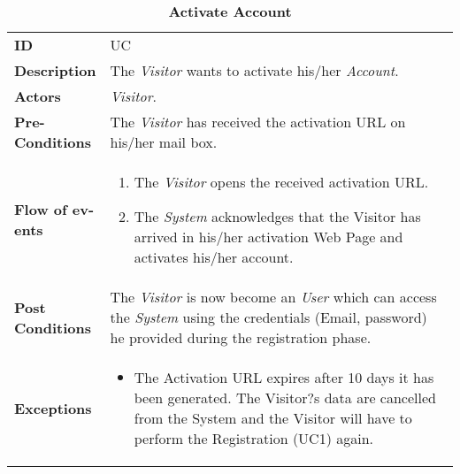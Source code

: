 \begin{longtable}{|p{0.2\linewidth} p{0.8\linewidth}|}
	\captionsetup{labelformat=empty} %
	\caption{\textbf{Activate Account}} %
	\label{UC_Activate}	\\ \hline
	
	\textbf{ID} & UC\theUseCaseIdCounter \\ \hline
	\textbf{Description} & The \emph{Visitor} wants to activate his/her \emph{Account}. \\ \hline
	\textbf{Actors} & \emph{Visitor}.\\ \hline
	\textbf{Pre-Conditions} & The \emph{Visitor} has received the activation URL on his/her mail box. \\ \hline
	\textbf{Flow of ev-ents} & 
	\begin{enumerate}
		\item The \emph{Visitor} opens the received activation URL.
		\item The \emph{System} acknowledges that the Visitor has arrived in his/her activation Web Page and activates his/her account.
	\end{enumerate}	 \\ \hline
	\textbf{Post Conditions} & The \emph{Visitor} is now become an \emph{User} which can access the \emph{System} using the credentials (Email, password) he provided during the registration phase. \\ \hline
	\textbf{Exceptions} & 
	\begin{itemize}
		\item The Activation URL expires after 10 days it has been generated. The Visitor?s data are cancelled from the System and the Visitor will have to perform the Registration (UC1) again.
	\end{itemize} \\ \hline
\end{longtable}


